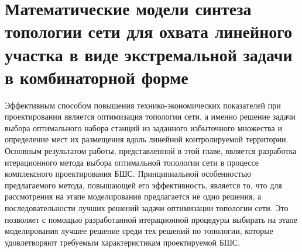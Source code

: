 



\section{Математические модели синтеза топологии сети для охвата линейного участка в виде экстремальной задачи в комбинаторной форме}

Эффективным способом повышения технико-экономических показателей при проектировании  является оптимизация топологии сети, а именно решение задачи выбора оптимального набора станций из заданного избыточного множества и определение мест их размещения вдоль линейной контролируемой территории.
Основным результатом работы, представленной в этой главе, является разработка итерационного метода выбора оптимальной топологии сети в процессе комплексного проектирования БШС. 
Принципиальной особенностью предлагаемого метода, повышающей его эффективность, является то, что для рассмотрения на этапе моделирования предлагается не одно решения, а последовательности лучших решений задачи оптимизации топологии сети. Это позволяет с помощью разработанной итерационной процедуры выбирать на этапе моделирования лучшее решение среди тех решений по топологии, которые удовлетворяют требуемым характеристикам проектируемой БШС. 

